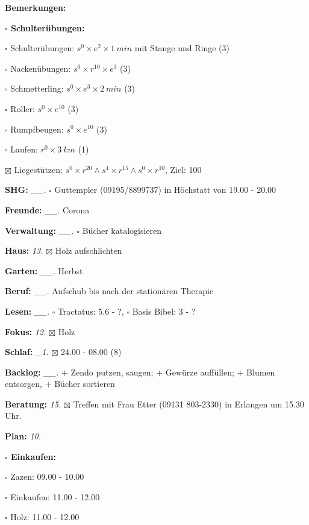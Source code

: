 \documentclass[10pt,a4paper]{article}
\newcommand\prop[1] {{\color {alizarin} {\bf #1}}}             %
\newcommand\opti[1] {{\color {amethyst} {\bf #1}}}             %
\newcommand\mand[1] {{\color {burntorange} {\bf #1}}}          %
\newcommand\topspace{\vskip -15pt \hskip 20pt}
\newcommand\bottomspace{\vskip 4pt}
\newcommand\n[1] { {\sl #1.} \hskip 5pt }
\begin{document}
\begin{mdframed}[style=daystyle]
\begin{labeling}{{\mand {Bemerkungen:}}}
\begin{minipage}{0.75\textwidth}
\begin{labeling}{\prop {$\square$ {Schulterübungen:}}}
        \setlength\itemsep{-3pt}
      \item[$\square$ Schulterübungen:] $s^0 \times e^2 \times 1\ min$ mit Stange und Ringe (3)
      \item[$\square$ Nackenübungen:]   $s^0 \times r^{10} \times e^3$ (3)
      \item[$\square$ Schmetterling:]   $s^0 \times e^3 \times 2\ min$ (3)
      \item[$\square$ Roller:]          $s^0 \times e^{10}$ (3)
      \item[$\square$ Rumpfbeugen:]     $s^0 \times e^{10}$ (3)
      \item[$\square$ Laufen:]          $r^0 \times 3\ km$ (1)
      \item[$\boxtimes$ Liegestützen:] $s^0 \times r^{20} \land s^4 \times r^{15} \land s^0 \times r^{10}$, Ziel: 100
      \end{labeling}
    \end{minipage}
    \bottomspace        
  \item[{\mand {SHG:}}]          \n{\_\_} $\square$ Guttempler (09195/8899737) in Höchstatt von 19.00 - 20.00
  \item[{\mand {Freunde:}}]      \n{\_\_} Corona
  \item[{\mand {Verwaltung:}}]   \n{\_\_} $\square$ Bücher katalogisieren
  \item[{\mand {Haus:}}]           \n{13} $\boxtimes$ Holz aufschlichten
  \item[{\mand {Garten:}}]       \n{\_\_} Herbst
  \item[{\mand {Beruf:}}]        \n{\_\_} Aufschub bis nach der stationären Therapie
  \item[{\mand {Lesen:}}]        \n{\_\_} $\square$ Tractatus: 5.6 - ?, $\square$ Basis Bibel: 3 - ?
  \item[{\mand {Fokus:}}]          \n{12} $\boxtimes$ Holz
  \item[{\mand {Schlaf:}}]        \n{\_1} $\boxtimes$ 24.00 - 08.00 (8)
  \item[{\mand {Backlog:}}]      \n{\_\_} 
    $+$ Zendo putzen, saugen; $+$ Gewürze auffüllen; $+$ Blumen entsorgen, $+$ Bücher sortieren
  \item[{\opti {Beratung:}}]       \n{15} $\boxtimes$ Treffen mit Frau Etter (09131 803-2330) in Erlangen um 15.30 Uhr.
  \item[{\mand {Plan:}}]           \n{10}
    \topspace
    \begin{minipage}{0.75\textwidth}  
      \begin{labeling}{\prop {$\square$ {Einkaufen:}}} 
        \setlength\itemsep{-3pt}
      \item[$\square$ Zazen:]     09.00 - 10.00
      \item[$\square$ Einkaufen:] 11.00 - 12.00
      \item[$\square$ Holz:]      11.00 - 12.00
        

\end{labeling}
\end{minipage}
\end{labeling}
\end{mdframed}
\end{document}
